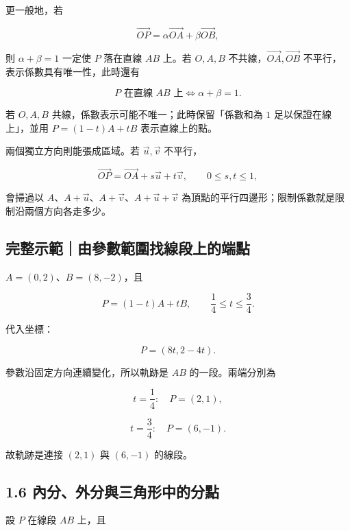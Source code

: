 \documentclass[11pt,a4paper]{article}
\begin{document}
更一般地，若

\[
\overrightarrow{OP}
=\alpha\overrightarrow{OA}+\beta\overrightarrow{OB},
\]

則 \(\alpha+\beta=1\) 一定使 \(P\) 落在直線 \(AB\) 上。若 \(O,A,B\) 不共線，\(\overrightarrow{OA},\overrightarrow{OB}\) 不平行，表示係數具有唯一性，此時還有

\[
\boxed{P\text{ 在直線 }AB\text{ 上}\iff\alpha+\beta=1}.
\]

若 \(O,A,B\) 共線，係數表示可能不唯一；此時保留「係數和為 \(1\) 足以保證在線上」，並用 \(P=(1-t)A+tB\) 表示直線上的點。

兩個獨立方向則能張成區域。若 \(\vec u,\vec v\) 不平行，

\[
\overrightarrow{OP}
=\overrightarrow{OA}+s\vec u+t\vec v,
\qquad 0\le s,t\le1,
\]

會掃過以 \(A\)、\(A+\vec u\)、\(A+\vec v\)、\(A+\vec u+\vec v\) 為頂點的平行四邊形；限制係數就是限制沿兩個方向各走多少。

\begin{HandoutWorkedExample}

\subsection{完整示範｜由參數範圍找線段上的端點}\label{ux5b8cux6574ux793aux7bc4ux7531ux53c3ux6578ux7bc4ux570dux627eux7ddaux6bb5ux4e0aux7684ux7aefux9ede}

\(A=(0,2)\)、\(B=(8,-2)\)，且

\[
P=(1-t)A+tB,
\qquad \frac14\le t\le\frac34.
\]

代入坐標：

\[
P=(8t,2-4t).
\]

參數沿固定方向連續變化，所以軌跡是 \(AB\) 的一段。兩端分別為

\[
t=\frac14:\quad P=(2,1),
\]

\[
t=\frac34:\quad P=(6,-1).
\]

故軌跡是連接 \(\boxed{(2,1)}\) 與 \(\boxed{(6,-1)}\) 的線段。

\end{HandoutWorkedExample}

\subsection{1.6 內分、外分與三角形中的分點}\label{ux5167ux5206ux5916ux5206ux8207ux4e09ux89d2ux5f62ux4e2dux7684ux5206ux9ede}

設 \(P\) 在線段 \(AB\) 上，且
\end{document}
